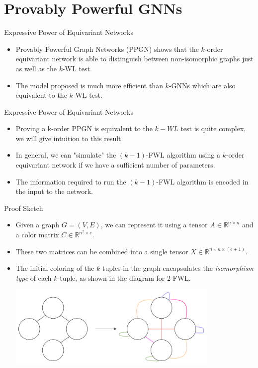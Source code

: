 \documentclass{beamer}
\begin{document}
\section{Provably Powerful GNNs}
\begin{frame}{Expressive Power of Equivariant Networks}
    \begin{itemize}
        \item Provably Powerful Graph Networks (PPGN) shows that the $k$-order equivariant network is able to distinguish between non-isomorphic graphs just as well as the $k$-WL test.
        \item The model proposed is much more efficient than $k$-GNNs which are also equivalent to the $k$-WL test.
    \end{itemize}
\end{frame}
\begin{frame}{Expressive Power of Equivariant Networks}
    \begin{itemize}
        \item Proving a k-order PPGN is equivalent to the $k-WL$ test is quite complex, we will give intuition to this result.
        \pause
        \item In general, we can "simulate" the $(k-1)$-FWL algorithm using a $k$-order equivariant network if we have a sufficient number of parameters.
        \pause
        \item The information required to run the $(k-1)$-FWL algorithm is encoded in the input to the network.
    \end{itemize}
\end{frame}
\begin{frame}{Proof Sketch}
    \begin{itemize}
        \item Given a graph $G = (V, E)$, we can represent it using a tensor $A \in \mathbb{R}^{n\times n}$ and a color matrix $C \in \mathbb{R}^{n^2\times e}$.
        \item These two matrices can be combined into a single tensor $X \in \mathbb{R}^{n\times n\times (e+1)}$.
        \pause
        \item The initial coloring of the $k$-tuples in the graph encapsulates the \textit{isomorphism type} of each $k$-tuple, as shown in the diagram for 2-FWL.
        \begin{center}
            \includegraphics[width=0.8\textwidth]{../figures/initial_coloring.png}
        \end{center}
    \end{itemize}
\end{frame}
\end{document}

